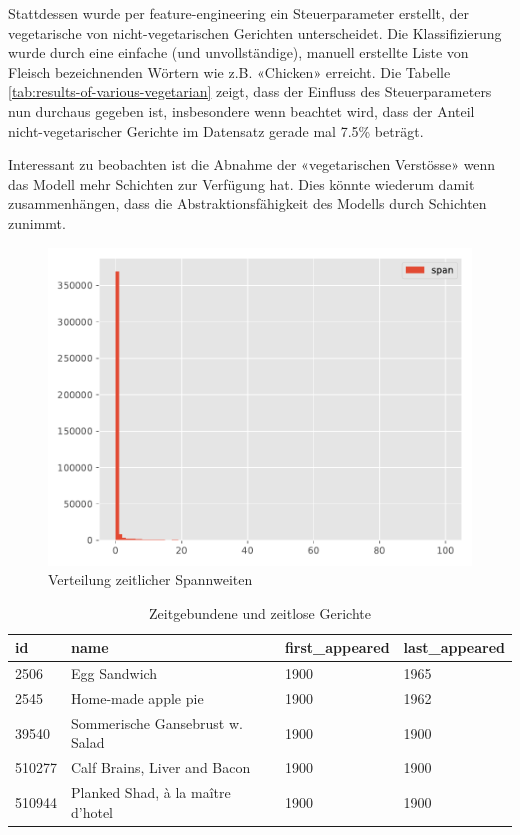 Stattdessen wurde per \gls{feature-engineering} ein Steuerparameter erstellt, der vegetarische von nicht-vegetarischen Gerichten unterscheidet.
Die Klassifizierung wurde durch eine einfache (und unvollständige), manuell erstellte Liste von Fleisch bezeichnenden Wörtern wie z.B. «Chicken» erreicht.
Die Tabelle \ref{tab:results-of-various-vegetarian} zeigt, dass der Einfluss des Steuerparameters nun durchaus gegeben ist, insbesondere wenn beachtet wird,
dass der Anteil nicht-vegetarischer Gerichte im Datensatz gerade mal 7.5\% beträgt.

Interessant zu beobachten ist die Abnahme der «vegetarischen Verstösse» wenn das Modell mehr Schichten zur Verfügung hat.
Dies könnte wiederum damit zusammenhängen, dass die Abstraktionsfähigkeit des Modells durch Schichten zunimmt.

\begin{figure}
    \centering
    \includegraphics[width=0.75\linewidth]{images/analysis/histogram-datespans.pdf}
    \caption{Verteilung zeitlicher Spannweiten}
    \label{fig:hist-dates-datespans}
\end{figure}



\begin{center}
    \begin{table}
        \centering
        \small
        \begin{tabular}{ |l|l|l|l| }

            \hline
            \textbf{id} & \textbf{name} & \textbf{first\_appeared} & \textbf{last\_appeared} \\
            \hline
            2506 & Egg Sandwich & 1900 & 1965 \\
            2545 & Home-made apple pie & 1900 & 1962 \\
            39540 & Sommerische Gansebrust w. Salad & 1900 & 1900 \\
            510277 & Calf Brains, Liver and Bacon & 1900 & 1900 \\
            510944 & Planked Shad, à la maître d'hotel & 1900 & 1900 \\
            \hline
        \end{tabular} \\

        \caption{Zeitgebundene und zeitlose Gerichte}
        \label{tab:data-1900}
    \end{table}
\end{center}

